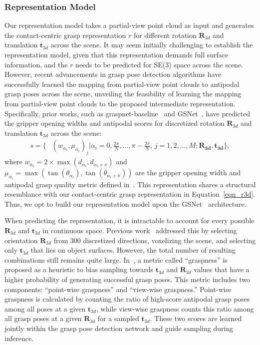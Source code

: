 \subsubsection*{Representation Model} \label{repre_model}
Our representation model takes a partial-view point cloud as input and generates the contact-centric grasp representation $r$ for different rotation $\mathbf{R}_{3d}$ and translation $\mathbf{t}_{3d}$ across the scene. It may seem initially challenging to establish the representation model, given that this representation demands full surface information, and the $r$ needs to be predicted for SE(3) space across the scene. However, recent advancements in grasp pose detection algorithms have successfully learned the mapping from partial-view point clouds to antipodal grasp poses across the scene, unveiling the feasibility of learning the mapping from partial-view point clouds to the proposed intermediate representation. Specifically, prior works, such as graspnet-baseline~\cite{graspnet} and GSNet~\cite{wang2021graspness}, have predicted the gripper opening widths and antipodal scores for discretized rotation $\mathbf{R}_{3d}$ and translation $\mathbf{t}_{3d}$ across the scene:   
\begin{align}
s = \bigg\{ & (w_{\alpha_i}, \mu_{\alpha_i})_j  \bigg|  \alpha_i = 0, \frac{2\pi}{N}, \ldots, \pi-\frac{2\pi}{N}, \, j = 1, 2, \ldots, M;  \mathbf{R_{3d}}, \mathbf{t_{3d}} \bigg\},
\label{grasprep}
\end{align}  
where $w_{\alpha_i} = 2\times\max(d_{\alpha_i}, d_{\alpha_i+\pi})$ and  $\mu_{\alpha_i} = \max(\tan(\theta_{\alpha_i}), \tan(\theta_{\alpha_i+\pi}))$ are the gripper opening width and antipodal grasp quality metric defined in~\cite{graspnet}. This representation shares a structural resemblance with our contact-centric grasp representation in Equation~\eqref{eqn_r3d}. Thus, we opt to build our representation model upon the GSNet~\cite{wang2021graspness} architecture.
 
When predicting the representation, it is intractable to account for every possible \(\mathbf{R}_{3d}\) and \(\mathbf{t}_{3d}\) in continuous space. Previous work~\cite{graspnet,wang2021graspness} addressed this by selecting orientation \(\mathbf{R}_{3d}\) from 300 discretized directions, voxelizing the scene, and selecting only \(\mathbf{t}_{3d}\) that lies on object surfaces. However, the total number of resulting combinations still remains quite large. In~\cite{wang2021graspness}, a metric called “graspness” is proposed as a heuristic to bias sampling towards \(\mathbf{t}_{3d}\) and \(\mathbf{R}_{3d}\) values that have a higher probability of generating successful grasp poses. This metric includes two components: “point-wise graspness” and “view-wise graspness.” Point-wise graspness is calculated by counting the ratio of high-score antipodal grasp poses among all poses at a given \(\mathbf{t}_{3d}\), while view-wise graspness counts this ratio among all grasp poses at a given \(\mathbf{R}_{3d}\) for a sampled \(\mathbf{t}_{3d}\). These two scores are learned jointly within the grasp pose detection network and guide sampling during inference.

